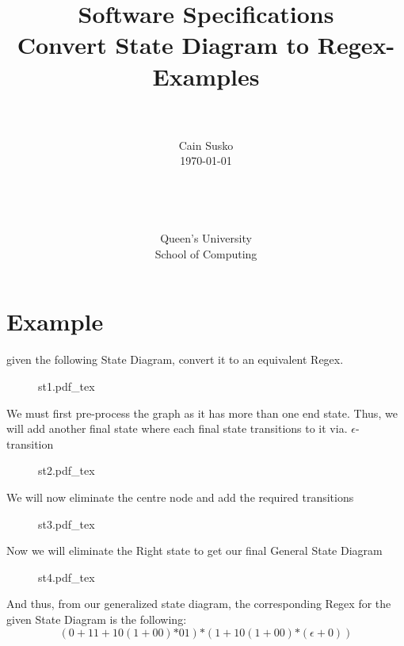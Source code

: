 \documentclass[12pt]{book}
\newcommand{\classID}{Convert State Diagram to Regex-Examples}
\newcommand{\coursename}{Software Specifications}
\newcommand{\incfig}[1]{%
    {#1.pdf_tex}
}
\begin{document}
\date{}
\setlength{\parindent}{0em}  %

\title{\coursename\\\classID}

\author{\\ \\ Cain Susko\\\today \\ \\ \\ \\ \\
        Queen's University \\School of Computing} 
 

\maketitle

\pagebreak

\section*{Example}
given the following State Diagram, convert it to an equivalent Regex.
\begin{figure}[h]
        \centering
        \incfig{st1}
\end{figure}

We must first pre-process the graph as it has more than one end state. 
Thus, we will add another final state where each final state transitions to it via. $\epsilon$-transition
 \begin{figure}
        \centering
        \incfig{st2}
\end{figure}
\pagebreak

We will now eliminate the centre node and add the required transitions
\begin{figure}[h]
        \centering
        \incfig{st3}
\end{figure}

Now we will eliminate the Right state to get our final General State Diagram
\begin{figure}[h]
        \centering
        \incfig{st4}
\end{figure}

And thus, from our generalized state diagram, the corresponding Regex for the given State Diagram is the following:
\[\left( 0+11+10\left( 1+00 \right)\text{*} 01 \right)\text{*} (1+10(1+00)\text{*}(\epsilon + 0))\]
\end{document}
